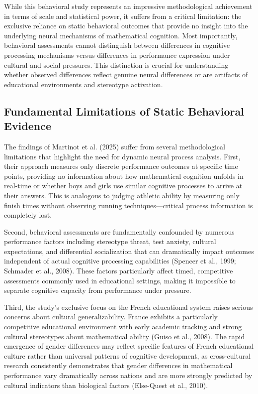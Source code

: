 \documentclass[12pt, a4paper]{article}
\begin{document}
While this behavioral study represents an impressive methodological achievement in terms of scale and statistical power, it suffers from a critical limitation: the exclusive reliance on static behavioral outcomes that provide no insight into the underlying neural mechanisms of mathematical cognition. Most importantly, behavioral assessments cannot distinguish between differences in cognitive processing mechanisms versus differences in performance expression under cultural and social pressures. This distinction is crucial for understanding whether observed differences reflect genuine neural differences or are artifacts of educational environments and stereotype activation.


\subsection{Fundamental Limitations of Static Behavioral Evidence}
The findings of Martinot et al. (2025) suffer from several methodological limitations that highlight the need for dynamic neural process analysis. First, their approach measures only discrete performance outcomes at specific time points, providing no information about how mathematical cognition unfolds in real-time or whether boys and girls use similar cognitive processes to arrive at their answers. This is analogous to judging athletic ability by measuring only finish times without observing running techniques—critical process information is completely lost.

Second, behavioral assessments are fundamentally confounded by numerous performance factors including stereotype threat, test anxiety, cultural expectations, and differential socialization that can dramatically impact outcomes independent of actual cognitive processing capabilities (Spencer et al., 1999; Schmader et al., 2008). These factors particularly affect timed, competitive assessments commonly used in educational settings, making it impossible to separate cognitive capacity from performance under pressure.

Third, the study's exclusive focus on the French educational system raises serious concerns about cultural generalizability. France exhibits a particularly competitive educational environment with early academic tracking and strong cultural stereotypes about mathematical ability (Guiso et al., 2008). The rapid emergence of gender differences may reflect specific features of French educational culture rather than universal patterns of cognitive development, as cross-cultural research consistently demonstrates that gender differences in mathematical performance vary dramatically across nations and are more strongly predicted by cultural indicators than biological factors (Else-Quest et al., 2010).
\end{document}
